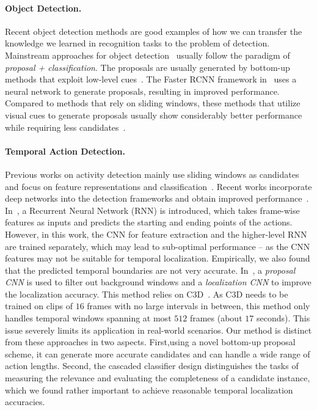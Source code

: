 \documentclass[10pt,twocolumn,letterpaper]{article}
\begin{document}
\vspace{-8pt}
\paragraph{Object Detection.}
Recent object detection methods are good examples of 
how we can transfer the knowledge we learned in recognition tasks to the problem of detection.
Mainstream approaches for object detection~\cite{Girshick2014RCNN,Girshick2015FRCNN,Ren2015FasterRCNN} 
usually follow the paradigm of \emph{proposal + classification}.
The proposals are usually generated by bottom-up methods that exploit low-level cues~\cite{Van2011SS,Dollar2014Edgebox}.
The Faster RCNN framework in~\cite{Ren2015FRCNN} uses a neural network to generate proposals,
resulting in improved performance. 
Compared to methods that rely on sliding windows, these methods that utilize visual cues to generate
proposals usually show considerably better performance while requiring less candidates~\cite{Girshick2014RCNN}.

\vspace{-8pt}
\paragraph{Temporal Action Detection.}
Previous works on activity detection mainly use sliding windows as candidates 
and focus on feature representations and 
classification~\cite{Gaidon2013Actom,Tang2013RightFeature,Oneata2013FV,Mettes2015Bofrag,Yuan2016ScorePyramids}.
Recent works incorporate deep networks into the detection frameworks and obtain improved performance~\cite{Yeung2016FrameGlimpse,Shou2016SCNN}.
In~\cite{Yeung2016FrameGlimpse}, 
a Recurrent Neural Network (RNN) is introduced, which takes frame-wise features as inputs
and predicts the starting and ending points of the actions. 
However, in this work, the CNN for feature extraction and the higher-level RNN are trained separately,
which may lead to sub-optimal performance -- as the CNN features may not be suitable for temporal localization.
Empirically, we also found that the predicted temporal boundaries are not very accurate.
In~\cite{Shou2016SCNN}, a \emph{proposal CNN} is used to filter out background windows 
and a \emph{localization CNN} to improve the localization accuracy.
This method relies on C3D~\cite{Tran15C3D}.
As C3D needs to be trained on clips of $16$ frames with no large intervals in between,
this method only handles temporal windows spanning at most $512$ frames (about $17$ seconds). 
This issue severely limits its application in real-world scenarios.
Our method is distinct from these approaches in two aspects.
First,using a novel bottom-up proposal scheme, it can generate more accurate candidates
and can handle a wide range of action lengths.
Second, the cascaded classifier design distinguishes the tasks of measuring the relevance and evaluating the completeness of a candidate instance, which we found rather important to achieve reasonable temporal localization accuracies.
 
\end{document}
